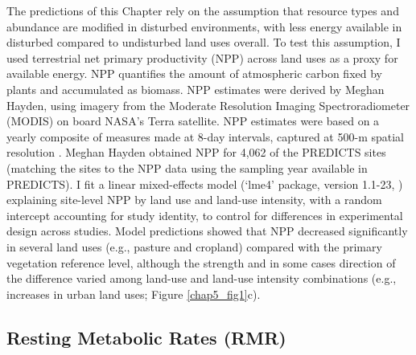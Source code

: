 The predictions of this Chapter rely on the assumption that resource types and abundance are modified in disturbed environments, with less energy available in disturbed compared to undisturbed land uses overall. To test this assumption, I used terrestrial net primary productivity (NPP) across land uses as a proxy for available energy. NPP quantifies the amount of atmospheric carbon fixed by plants and accumulated as biomass. NPP estimates were derived by Meghan Hayden, using imagery from the Moderate Resolution Imaging Spectroradiometer (MODIS) on board NASA’s Terra satellite. NPP estimates were based on a yearly composite of measures made at 8-day intervals, captured at 500-m spatial resolution \citep{Running2015}. Meghan Hayden obtained NPP for 4,062 of the PREDICTS sites (matching the sites to the NPP data using the sampling year available in PREDICTS). I fit a linear mixed-effects model (`lme4' package, version 1.1-23, \citet{Bates2015}) explaining site-level NPP by land use and land-use intensity, with a random intercept accounting for study identity, to control for differences in experimental design across studies. Model predictions showed that NPP decreased significantly in several land uses (e.g., pasture and cropland) compared with the primary vegetation reference level, although the strength and in some cases direction of the difference varied among land-use and land-use intensity combinations (e.g., increases in urban land uses; Figure \ref{chap5_fig1}c).

\subsection{Resting Metabolic Rates (RMR)}

